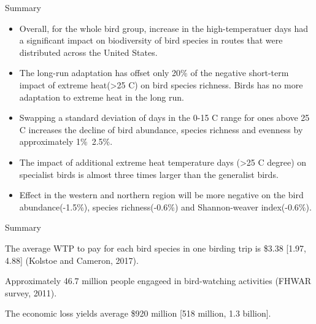 \documentclass[handout]{beamer}
\begin{document}
\begin{frame}{Summary}

  \footnotesize
  \begin{itemize}
  \item
  Overall, for the whole bird group, increase in the high-temperatuer days had a significant impact on biodiversity of bird species in routes that were distributed across the United States.
  \item The long-run adaptation has offset only 20\% of the negative short-term impact of extreme heat(>25 C) on bird species richness. Birds has no more adaptation to extreme heat in the long run.
  \item
    Swapping a standard deviation of days in the 0-15 C range for ones above 25 C increases the decline of bird abundance, species richness and evenness by approximately 1\%~2.5\%.
  \item
  The impact of additional extreme heat temperature days (>25 C degree) on specialist birds is almost three times larger than the generalist birds.
  \item
  Effect in the western and northern region will be more negative on the bird abundance(-1.5\%), species richness(-0.6\%) and Shannon-weaver index(-0.6\%).
  \end{itemize}
\end{frame}

\begin{frame}{Summary}
  \item The average WTP to pay for each bird species in one birding trip is \$3.38 [1.97, 4.88] (Kolstoe and Cameron, 2017).
  \item Approximately 46.7 million people engageed in bird-watching activities (FHWAR survey, 2011).
  \item The economic loss yields average \$920 million [518 million, 1.3 billion].
\end{frame}
\end{document}
